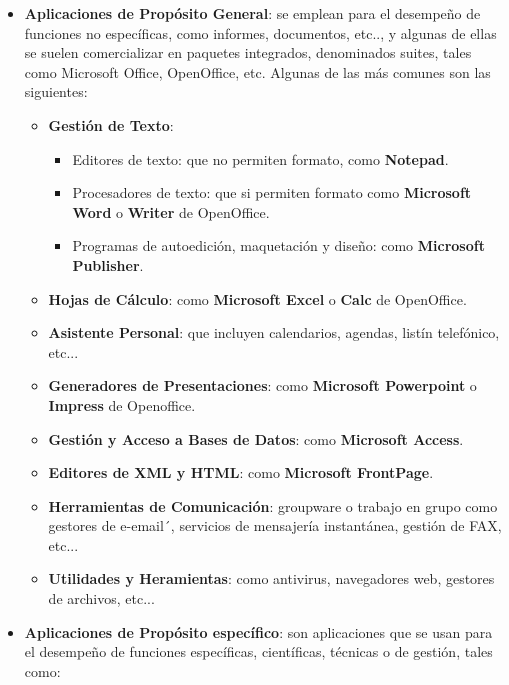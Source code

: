 \begin{itemize}
    \item \textbf{Aplicaciones de Propósito General}: se emplean para el desempeño de funciones no específicas, como informes, documentos, etc.., y algunas de ellas se suelen comercializar en paquetes integrados, denominados suites, tales como Microsoft Office, OpenOffice, etc. Algunas de las más comunes son las siguientes:

    \begin{itemize}
        \item \textbf{Gestión de Texto}:
        \begin{itemize}
            \item Editores de texto: que no permiten formato, como \textbf{Notepad}.
            \item Procesadores de texto: que si permiten formato como \textbf{Microsoft Word} o \textbf{Writer} de OpenOffice.
            \item Programas de autoedición, maquetación y diseño: como \textbf{Microsoft Publisher}.
        \end{itemize}

        \item \textbf{Hojas de Cálculo}: como \textbf{Microsoft Excel} o \textbf{Calc} de OpenOffice.
        \item \textbf{Asistente Personal}: que incluyen calendarios, agendas, listín telefónico, etc...
        \item \textbf{Generadores de Presentaciones}: como \textbf{Microsoft Powerpoint} o \textbf{Impress} de Openoffice.
        \item \textbf{Gestión y Acceso a Bases de Datos}: como \textbf{Microsoft Access}.
        \item \textbf{Editores de XML y HTML}: como \textbf{Microsoft FrontPage}.
        \item \textbf{Herramientas de Comunicación}: groupware o trabajo en grupo como gestores de e-email´, servicios de mensajería instantánea, gestión de FAX, etc...
        \item \textbf{Utilidades y Heramientas}: como antivirus, navegadores web, gestores de archivos, etc...
    \end{itemize}

    \item \textbf{Aplicaciones de Propósito específico}: son aplicaciones que se usan para el desempeño de funciones específicas, científicas, técnicas o de gestión, tales como:


\end{itemize}
